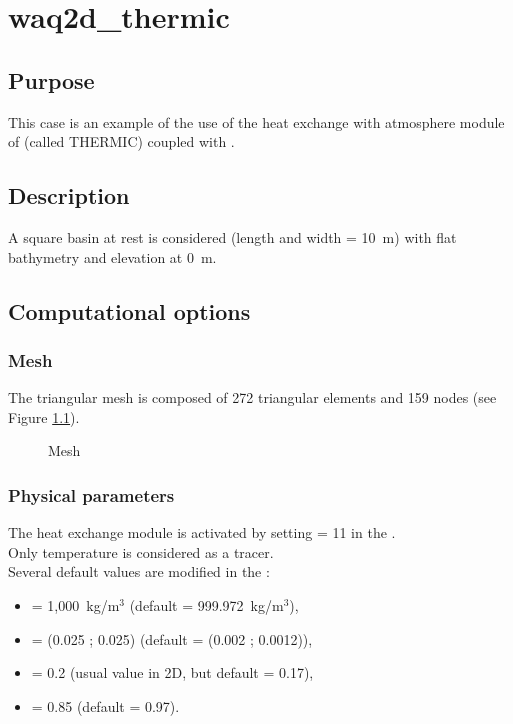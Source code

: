 \chapter{waq2d\_thermic}
%
%
\section{Purpose}
%
This case is an example of the use of the heat exchange with atmosphere module
of \waqtel (called THERMIC) coupled with .
%
\section{Description}
%
A square basin at rest is considered (length and width = 10~m)
with flat bathymetry and elevation at 0~m.
%
\section{Computational options}
%
\subsection{Mesh}
%
The triangular mesh is composed of 272 triangular elements and 159 nodes
(see Figure \ref{fig:waq2d_thermic:mesh}).

\begin{figure}[H]
 \centering
\caption{Mesh}
 \label{fig:waq2d_thermic:mesh}
\end{figure}
%
\subsection{Physical parameters}
%
The heat exchange module is activated by setting 
= 11 in the  .\\

Only temperature is considered as a tracer.\\

Several default values are modified in the \waqtel {}:
\begin{itemize}
\item {} = 1,000~kg/m$^3$ (default = 999.972~kg/m$^3$),
\item {} = (0.025 ; 0.025) (default = (0.002 ; 0.0012)),
\item {} = 0.2 (usual value in 2D, but default = 0.17),
\item {} = 0.85 (default = 0.97).
\end{itemize}

